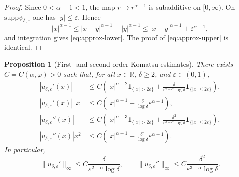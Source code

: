 \documentclass[11pt]{article}
\newtheorem{proposition}[theorem]{Proposition}
\newcommand{\R}{\mathbb{R}}
\newcommand{\1}{\mathbf{1}}
\newcommand{\eps}{\varepsilon}
\newcommand{\supp}{\mathrm{supp}}
\begin{document}
\begin{proof}
Since $0<\alpha-1<1$, the map $r\mapsto r^{\alpha-1}$ is subadditive on $[0,\infty)$. On $\supp\psi_{\delta,\eps}$ one has $|y|\le\eps$. Hence
\[
  |x|^{\alpha-1}\le |x-y|^{\alpha-1}+|y|^{\alpha-1}\le |x-y|^{\alpha-1}+\eps^{\alpha-1},
\]
and integration gives \eqref{eq:approx-lower}. The proof of \eqref{eq:approx-upper} is identical.
\end{proof}

\begin{proposition}[First- and second-order Komatsu estimates]\label{prop:komatsu}
There exists $C=C(\alpha,\varphi)>0$ such that, for all $x\in\R$, $\delta\ge2$, and $\eps\in(0,1)$,
\begin{align}
|u_{\delta,\eps}'(x)|
&\le C\left(|x|^{\alpha-2}\1_{\{|x|>2\eps\}}
+\frac{\delta}{\eps^{2-\alpha}\log\delta}\1_{\{|x|\le2\eps\}}\right), \label{eq:delta-first}\\
|u_{\delta,\eps}'(x)|\,|x|
&\le C\left(|x|^{\alpha-1}+\frac{\delta}{\log\delta}\eps^{\alpha-1}\right), \label{eq:delta-first-product}\\
|u_{\delta,\eps}''(x)|
&\le C\left(|x|^{\alpha-3}\1_{\{|x|>2\eps\}}
+\frac{\delta^2}{\eps^{3-\alpha}\log\delta}\1_{\{|x|\le2\eps\}}\right), \label{eq:delta-second}\\
|u_{\delta,\eps}''(x)|x^2
&\le C\left(|x|^{\alpha-1}+\frac{\delta^2}{\log\delta}\eps^{\alpha-1}\right). \label{eq:delta-second-product}
\end{align}
In particular,
\begin{equation}\label{eq:global-derivative-bounds}
  \|u_{\delta,\eps}'\|_\infty\le C\frac{\delta}{\eps^{2-\alpha}\log\delta},
  \qquad
  \|u_{\delta,\eps}''\|_\infty\le C\frac{\delta^2}{\eps^{3-\alpha}\log\delta}.
\end{equation}
\end{proposition}
\end{document}
